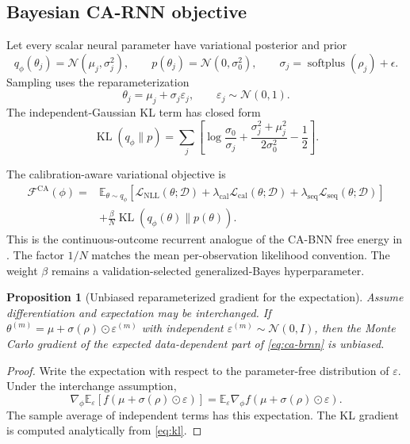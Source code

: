 \documentclass[11pt]{article}
\newtheorem{proposition}[definition]{Proposition}
\newcommand{\E}{\mathbb{E}}
\newcommand{\D}{\mathcal{D}}
\newcommand{\N}{\mathcal{N}}
\newcommand{\KL}{\operatorname{KL}}
\newcommand{\CA}{\mathrm{CA}}
\begin{document}
\subsection{Bayesian CA-RNN objective}

Let every scalar neural parameter have variational posterior and prior
\[
q_\phi(\theta_j)=\N(\mu_j,\sigma_j^2),
\qquad
p(\theta_j)=\N(0,\sigma_0^2),
\qquad
\sigma_j=\operatorname{softplus}(\rho_j)+\epsilon.
\]
Sampling uses the reparameterization
\[
\theta_j=\mu_j+\sigma_j\varepsilon_j,
\qquad \varepsilon_j\sim\N(0,1).
\]
The independent-Gaussian KL term has closed form
\begin{equation}
\KL(q_\phi\|p)
=\sum_j\left[
\log\frac{\sigma_0}{\sigma_j}
+\frac{\sigma_j^2+\mu_j^2}{2\sigma_0^2}-\frac12
\right].
\label{eq:kl}
\end{equation}

The calibration-aware variational objective is
\begin{align}
\mathcal F^{\CA}(\phi)
={}&\E_{\theta\sim q_\phi}\left[
\mathcal L_{\mathrm{NLL}}(\theta;\D)
+\lambda_{\mathrm{cal}}\mathcal L_{\mathrm{cal}}(\theta;\D)
+\lambda_{\mathrm{seq}}\mathcal L_{\mathrm{seq}}(\theta;\D)
\right]\\
&+\frac{\beta}{N}\KL(q_\phi(\theta)\|p(\theta)).
\label{eq:ca-brnn}
\end{align}
This is the continuous-outcome recurrent analogue of the CA-BNN free energy in
\cite{huang2024cabl}. The factor $1/N$ matches the mean per-observation likelihood
convention. The weight $\beta$ remains a validation-selected generalized-Bayes
hyperparameter.

\begin{proposition}[Unbiased reparameterized gradient for the expectation]
Assume differentiation and expectation may be interchanged. If
$\theta^{(m)}=\mu+\sigma(\rho)\odot\varepsilon^{(m)}$ with independent
$\varepsilon^{(m)}\sim\N(0,I)$, then the Monte Carlo gradient of the expected
data-dependent part of \eqref{eq:ca-brnn} is unbiased.
\end{proposition}

\begin{proof}
Write the expectation with respect to the parameter-free distribution of
$\varepsilon$. Under the interchange assumption,
\[
\nabla_\phi\E_\varepsilon[f(\mu+\sigma(\rho)\odot\varepsilon)]
=\E_\varepsilon\nabla_\phi f(\mu+\sigma(\rho)\odot\varepsilon).
\]
The sample average of independent terms has this expectation. The KL gradient is
computed analytically from \eqref{eq:kl}.
\end{proof}
\end{document}
